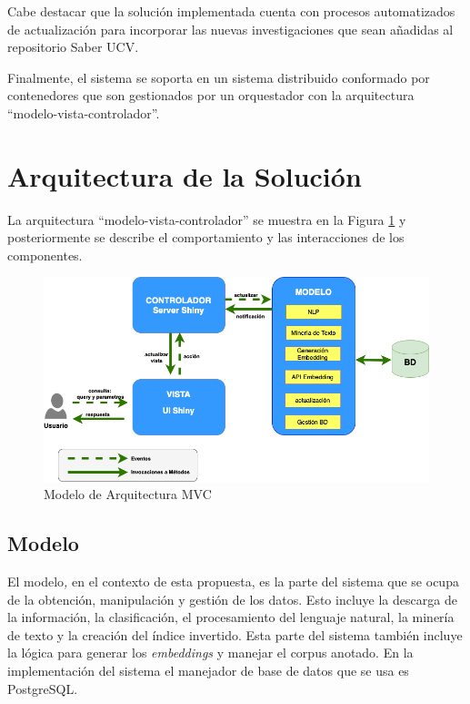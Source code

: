 \documentclass[
  12pt,
  openany]{book}
\begin{document}
Cabe destacar que la solución implementada cuenta con procesos automatizados de actualización para incorporar las nuevas investigaciones que sean añadidas al repositorio Saber UCV.

Finalmente, el sistema se soporta en un sistema distribuido conformado por contenedores que son gestionados por un orquestador con la arquitectura ``modelo-vista-controlador''.

\hypertarget{desarrolloarquitectura}{%
\section{Arquitectura de la Solución}\label{desarrolloarquitectura}}

La arquitectura ``modelo-vista-controlador'' se muestra en la Figura \ref{fig:arquitecturamvc} y posteriormente se describe el comportamiento y las interacciones de los componentes.

\begin{figure}

{\centering \includegraphics[width=0.9\linewidth]{images/05-desarrollo/MVC9} 

}

\caption{Modelo de Arquitectura MVC}\label{fig:arquitecturamvc}
\end{figure}

\hypertarget{modelo}{%
\subsection{\texorpdfstring{\textbf{Modelo}}{Modelo}}\label{modelo}}

El modelo\emph{,} en el contexto de esta propuesta, es la parte del sistema que se ocupa de la obtención, manipulación y gestión de los datos. Esto incluye la descarga de la información, la clasificación, el procesamiento del lenguaje natural, la minería de texto y la creación del índice invertido. Esta parte del sistema también incluye la lógica para generar los \emph{embeddings} y manejar el corpus anotado. En la implementación del sistema el manejador de base de datos que se usa es PostgreSQL.
\end{document}
